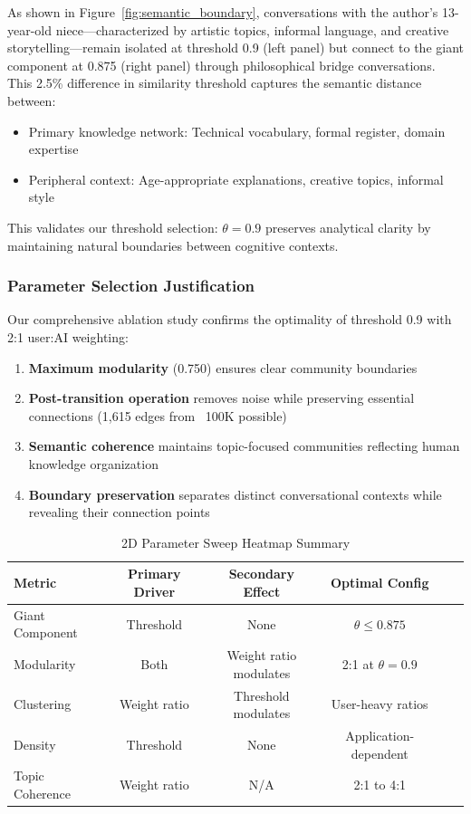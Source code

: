 \documentclass{svproc}
\begin{document}
As shown in Figure~\ref{fig:semantic_boundary}, conversations with the author's 13-year-old niece—characterized by artistic topics, informal language, and creative storytelling—remain isolated at threshold 0.9 (left panel) but connect to the giant component at 0.875 (right panel) through philosophical bridge conversations. This 2.5\% difference in similarity threshold captures the semantic distance between:

\begin{itemize}
    \item Primary knowledge network: Technical vocabulary, formal register, domain expertise
    \item Peripheral context: Age-appropriate explanations, creative topics, informal style
\end{itemize}

This validates our threshold selection: $\theta=0.9$ preserves analytical clarity by maintaining natural boundaries between cognitive contexts.

\subsubsection{Parameter Selection Justification}

Our comprehensive ablation study confirms the optimality of threshold 0.9 with 2:1 user:AI weighting:

\begin{enumerate}
    \item \textbf{Maximum modularity} (0.750) ensures clear community boundaries
    \item \textbf{Post-transition operation} removes noise while preserving essential connections (1,615 edges from ~100K possible)
    \item \textbf{Semantic coherence} maintains topic-focused communities reflecting human knowledge organization
    \item \textbf{Boundary preservation} separates distinct conversational contexts while revealing their connection points
\end{enumerate}

\begin{table}[h]
\centering
\caption{2D Parameter Sweep Heatmap Summary}
\label{tab:2d_summary}
\begin{tabular}{lccccc}
\toprule
\textbf{Metric} & \textbf{Primary Driver} & \textbf{Secondary Effect} & \textbf{Optimal Config} \\
\midrule
Giant Component & Threshold & None & $\theta \leq 0.875$ \\
Modularity & Both & Weight ratio modulates & 2:1 at $\theta=0.9$ \\
Clustering & Weight ratio & Threshold modulates & User-heavy ratios \\
Density & Threshold & None & Application-dependent \\
Topic Coherence & Weight ratio & N/A & 2:1 to 4:1 \\
\bottomrule
\end{tabular}
\end{table}
\end{document}

